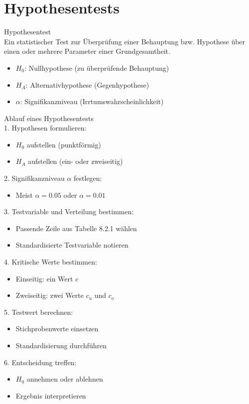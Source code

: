 \section{Hypothesentests}

\begin{definition}{Hypothesentest}\\
Ein statistischer Test zur Überprüfung einer Behauptung bzw. Hypothese über einen oder mehrere Parameter einer Grundgesamtheit.

\begin{itemize}
  \item $H_0$: Nullhypothese (zu überprüfende Behauptung)
  \item $H_A$: Alternativhypothese (Gegenhypothese)
  \item $\alpha$: Signifikanzniveau (Irrtumswahrscheinlichkeit)
\end{itemize}
\end{definition}

\begin{KR}{Ablauf eines Hypothesentests}\\
1. Hypothesen formulieren:
   \begin{itemize}
     \item $H_0$ aufstellen (punktförmig)
     \item $H_A$ aufstellen (ein- oder zweiseitig)
   \end{itemize}

2. Signifikanzniveau $\alpha$ festlegen:
   \begin{itemize}
     \item Meist $\alpha = 0.05$ oder $\alpha = 0.01$
   \end{itemize}

3. Testvariable und Verteilung bestimmen:
   \begin{itemize}
     \item Passende Zeile aus Tabelle 8.2.1 wählen
     \item Standardisierte Testvariable notieren
   \end{itemize}

4. Kritische Werte bestimmen:
   \begin{itemize}
     \item Einseitig: ein Wert $c$
     \item Zweiseitig: zwei Werte $c_u$ und $c_o$
   \end{itemize}

5. Testwert berechnen:
   \begin{itemize}
     \item Stichprobenwerte einsetzen
     \item Standardisierung durchführen
   \end{itemize}

6. Entscheidung treffen:
   \begin{itemize}
     \item $H_0$ annehmen oder ablehnen
     \item Ergebnis interpretieren
   \end{itemize}
\end{KR}

